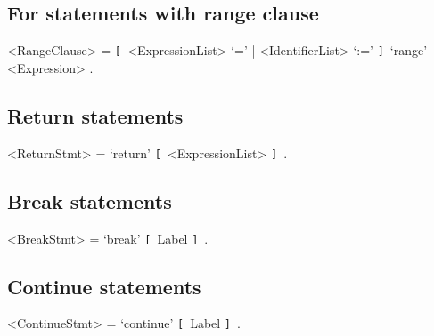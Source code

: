 \documentclass{article}
\def\lopt{\synshortsoff\texttt{[}\synshorts~}
\def\ropt{\synshortsoff\texttt{]}\synshorts~}
\begin{document}
\subsection*{For statements with range clause}
\begin{grammar}
	<RangeClause> = \lopt <ExpressionList> `=' | <IdentifierList> `:=' \ropt `range' <Expression> .
\end{grammar}

\subsection*{Return statements}
\begin{grammar}
	<ReturnStmt> = `return' \lopt <ExpressionList> \ropt .
\end{grammar} 

\subsection*{Break statements}
\begin{grammar}
	<BreakStmt> = `break' \lopt Label \ropt .
\end{grammar}


\subsection*{Continue statements}
\begin{grammar}
	<ContinueStmt> = `continue' \lopt Label \ropt .
\end{grammar}
\end{document}
